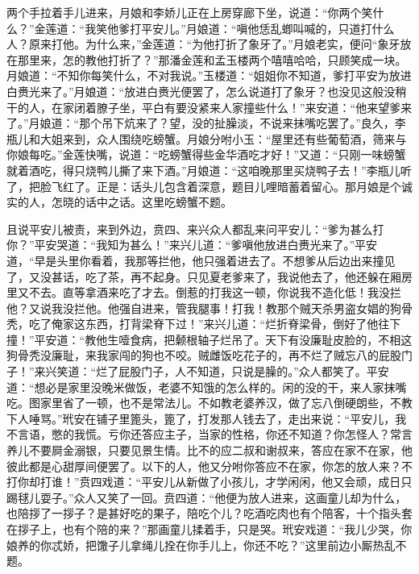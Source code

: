 两个手拉着手儿进来，月娘和李娇儿正在上房穿廊下坐，说道：“你两个笑什么？”金莲道：“我笑他爹打平安儿。”月娘道：“嗔他恁乱蝍叫喊的，只道打什么人？原来打他。为什么来，”金莲道：“为他打折了象牙了。”月娘老实，便问“象牙放在那里来，怎的教他打折了？”那潘金莲和孟玉楼两个嘻嘻哈哈，只顾笑成一块。月娘道：“不知你每笑什么，不对我说。”玉楼道：“姐姐你不知道，爹打平安为放进白赉光来了。”月娘道：“放进白赉光便罢了，怎么说道打了象牙？也没见这般没稍干的人，在家闭着膫子坐，平白有要没紧来人家撞些什么！”来安道：“他来望爹来了。”月娘道：“那个吊下炕来了？望，没的扯臊淡，不说来抹嘴吃罢了。”良久，李瓶儿和大姐来到，众人围绕吃螃蟹。月娘分咐小玉：“屋里还有些葡萄酒，筛来与你娘每吃。”金莲快嘴，说道：“吃螃蟹得些金华酒吃才好！”又道：“只刚一味螃蟹就着酒吃，得只烧鸭儿撕了来下酒。”月娘道：“这咱晚那里买烧鸭子去！”李瓶儿听了，把脸飞红了。正是：话头儿包含着深意，题目儿哩暗蓄着留心。那月娘是个诚实的人，怎晓的话中之话。这里吃螃蟹不题。

且说平安儿被责，来到外边，贲四、来兴众人都乱来问平安儿：“爹为甚么打你？”平安哭道：“我知为甚么！”来兴儿道：“爹嗔他放进白赉光来了。”平安道，“早是头里你看着，我那等拦他，他只强着进去了。不想爹从后边出来撞见了，又没甚话，吃了茶，再不起身。只见夏老爹来了，我说他去了，他还躲在厢房里又不去。直等拿酒来吃了才去。倒惹的打我这一顿，你说我不造化低！我没拦他？又说我没拦他。他强自进来，管我腿事！打我！教那个贼天杀男盗女娼的狗骨秃，吃了俺家这东西，打背梁脊下过！”来兴儿道：“烂折脊梁骨，倒好了他往下撞！”平安道：“教他生噎食病，把颡根轴子烂吊了。天下有没廉耻皮脸的，不相这狗骨秃没廉耻，来我家闯的狗也不咬。贼雌饭吃花子的，再不烂了贼忘八的屁股门子！”来兴笑道：“烂了屁股门子，人不知道，只说是臊的。”众人都笑了。平安道：“想必是家里没晚米做饭，老婆不知饿的怎么样的。闲的没的干，来人家抹嘴吃。图家里省了一顿，也不是常法儿。不如教老婆养汉，做了忘八倒硬朗些，不教下人唾骂。”玳安在铺子里篦头，篦了，打发那人钱去了，走出来说：“平安儿，我不言语，憋的我慌。亏你还答应主子，当家的性格，你还不知道？你怎怪人？常言养儿不要屙金溺银，只要见景生情。比不的应二叔和谢叔来，答应在家不在家，他彼此都是心甜厚间便罢了。以下的人，他又分咐你答应不在家，你怎的放人来？不打你却打谁！”贲四戏道：“平安儿从新做了小孩儿，才学闲闲，他又会顽，成日只踢毬儿耍子。”众人又笑了一回。贲四道：“他便为放人进来，这画童儿却为什么，也陪拶了一拶子？是甚好吃的果子，陪吃个儿？吃酒吃肉也有个陪客，十个指头套在拶子上，也有个陪的来？”那画童儿揉着手，只是哭。玳安戏道：“我儿少哭，你娘养的你忒娇，把馓子儿拿绳儿拴在你手儿上，你还不吃？”这里前边小厮热乱不题。

